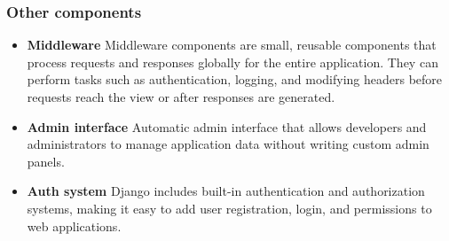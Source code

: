 \documentclass{article}
\begin{document}
	\subsubsection{Other components}
	\begin{itemize}
		\item \textbf{Middleware} Middleware components are small, reusable components that process requests and responses globally for the entire application. They can perform tasks such as authentication, logging, and modifying headers before requests reach the view or after responses are generated.
		\item \textbf{Admin interface} Automatic admin interface that allows developers and administrators to manage application data without writing custom admin panels.
		\item \textbf{Auth system} Django includes built-in authentication and authorization systems, making it easy to add user registration, login, and permissions to web applications.
	\end{itemize}
	
\end{document}
